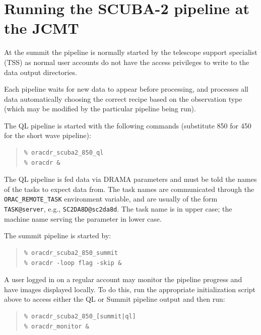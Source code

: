 \documentclass[twoside,11pt]{article}
\newcommand{\xlabel}[1]{}
\renewcommand{\_}{\texttt{\symbol{95}}}
\newenvironment{myquote}{\begin{quote}\begin{small}}{\end{small}\end{quote}}
\begin{document}
\section{\xlabel{runpipeline}Running the SCUBA-2 pipeline at the JCMT\label{se:runpipe}}

At the summit the pipeline is normally started by the telescope
support specialist (TSS) as normal user accounts do not have the
access privileges to write to the data output directories.

Each pipeline waits for new data to appear before processing, and
processes all data automatically choosing the correct recipe based on
the observation type (which may be modified by the particular pipeline
being run).

The QL pipeline is started with the following commands (substitute 850
for 450 for the short wave pipeline):

\begin{myquote}
\begin{verbatim}
% oracdr_scuba2_850_ql
% oracdr &
\end{verbatim}
\end{myquote}

The QL pipeline is fed data via DRAMA parameters and must be told the
names of the tasks to expect data from. The task names are
communicated through the \verb+ORAC_REMOTE_TASK+ environment
variable, and are usually of the form \verb+TASK@server+, e.g.,
\verb+SC2DA8D@sc2da8d+. The task name is in upper case; the machine
name serving the parameter in lower case.

The summit pipeline is started by:

\begin{myquote}
\begin{verbatim}
% oracdr_scuba2_850_summit
% oracdr -loop flag -skip &
\end{verbatim}
\end{myquote}

A user logged in on a regular account may monitor the pipeline
progress and have images displayed locally. To do this, run the
appropriate initialization script above to access either the QL or
Summit pipeline output and then run:

\begin{myquote}
\begin{verbatim}
% oracdr_scuba2_850_[summit|ql]
% oracdr_monitor &
\end{verbatim}
\end{myquote}
\end{document}
